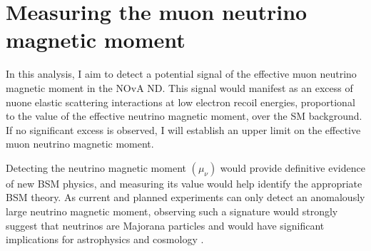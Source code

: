 \chapter{Measuring the muon neutrino magnetic moment}\label{sec:NeutrinoMagMoment}

In this analysis, I aim to detect a potential signal of the effective muon neutrino magnetic moment in the \gls{NOvA} \gls{ND}. This signal would manifest as an excess of \gls{nuone} elastic scattering interactions at low electron recoil energies, proportional to the value of the effective neutrino magnetic moment, over the \gls{SM} background. If no significant excess is observed, I will establish an upper limit on the effective muon neutrino magnetic moment.



Detecting the neutrino magnetic moment $\left(\mu_\nu\right)$ would provide definitive evidence of new \gls{BSM} physics, and measuring its value would help identify the appropriate \gls{BSM} theory. As current and planned experiments can only detect an anomalously large neutrino magnetic moment, observing such a signature would strongly suggest that neutrinos are Majorana particles and would have significant implications for astrophysics and cosmology \cite{SnowmassNeutrinoFrontierReport.pdf}.



